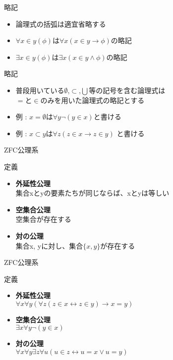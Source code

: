 \documentclass[17pt,aspectratio=169,xcolor=dvipsnames,table,dvipdfmx]{beamer}
\theoremstyle{definition}
\begin{document}
\begin{frame}{略記}
    \begin{itemize}
        \item 論理式の括弧は適宜省略する
        \item $\forall x \in y (\phi)$は$\forall x (x \in y \rightarrow \phi)$の略記
        \item $\exists x \in y (\phi)$は$\exists x (x \in y \land \phi)$の略記
    \end{itemize}
\end{frame}

\begin{frame}{略記}
    \begin{itemize}
        \item 普段用いている$\emptyset$,$\subset$,$\bigcup$等の記号を含む論理式は\\
              $=$と$\in$のみを用いた論理式の略記とする
        \item 例 : $x = \emptyset$は$\forall y \neg (y \in x)$と書ける
        \item 例 : $x \subset y$は$\forall z (z \in x \rightarrow z \in y)$ と書ける
    \end{itemize}
\end{frame}

\begin{frame}{ZFC公理系}
    \begin{block}{定義}
        \begin{itemize}
            \item \textbf{外延性公理} \\
                  集合xとyの要素たちが同じならば、xとyは等しい
            \item \textbf{空集合公理} \\
                  空集合が存在する
            \item \textbf{対の公理} \\
                  集合x, yに対し、集合$\{x, y\}$が存在する
        \end{itemize}
    \end{block}
\end{frame}

\begin{frame}{ZFC公理系}
    \begin{block}{定義}
        \begin{itemize}
            \item \textbf{外延性公理} \\
                  $\forall x \forall y (\forall z (z \in x \leftrightarrow z \in y) \rightarrow x = y)$
            \item \textbf{空集合公理} \\
                  $\exists x \forall y \neg (y \in x)$
            \item \textbf{対の公理} \\
                  $\forall x \forall y \exists z \forall u (u \in z \leftrightarrow u = x \lor u = y)$
        \end{itemize}
    \end{block}
\end{frame}
\end{document}
